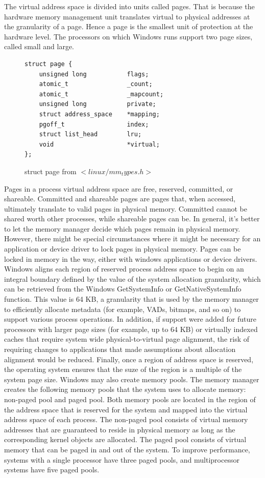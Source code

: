 \documentclass[letterpaper,10pt,draftclsnofoot,onecolumn]{IEEEtran}
\begin{document}
The virtual address space is divided into units called pages. That is because the hardware memory management unit translates virtual to physical addresses at the granularity of a page. Hence a page is the smallest unit of protection at the hardware level. The processors on which Windows runs support two page sizes, called small and large. 
\begin{figure}[H]
\caption{struct page from $<linux/mm_types.h>$}
\begin{lstlisting}
struct page {
	unsigned long 			flags;
	atomic_t				_count;
	atomic_t				_mapcount;
	unsigned long			private;
	struct address_space	*mapping;
	pgoff_t					index;
	struct list_head		lru;
	void					*virtual;
};
\end{lstlisting}
\end{figure}
Pages in a process virtual address space are free, reserved, committed, or shareable. Committed and shareable pages are pages that, when accessed, ultimately translate to valid pages in physical memory. Committed cannot be shared worth other processes, while shareable pages can be. In general, it’s better to let the memory manager decide which pages remain in physical memory. However, there might be special circumstances where it might be necessary for an application or device driver to lock pages in physical memory. Pages can be locked in memory in the way, either with windows applications or device drivers.
Windows aligns each region of reserved process address space to begin on an integral boundary
defined by the value of the system allocation granularity, which can be retrieved from the Windows GetSystemInfo or GetNativeSystemInfo function. This value is 64 KB, a granularity that is used by the memory manager to efficiently allocate metadata (for example, VADs, bitmaps, and so on) to support various process operations. In addition, if support were added for future processors with larger page sizes (for example, up to 64 KB) or virtually indexed caches that require system wide physical-to-virtual page alignment, the risk of requiring changes to applications that made assumptions about allocation alignment would be reduced.\cite{[1]}
Finally, once a region of address space is reserved, the operating system ensures that the suze of the region is a multiple of the system page size.
Windows may also create memory pools. The memory manager creates the following memory pools that the system uses to allocate memory: non-paged pool and paged pool. Both memory pools are located in the region of the address space that is reserved for the system and mapped into the virtual address space of each process. The non-paged pool consists of virtual memory addresses that are guaranteed to reside in physical memory as long as the corresponding kernel objects are allocated. The paged pool consists of virtual memory that can be paged in and out of the system. To improve performance, systems with a single processor have three paged pools, and multiprocessor systems have five paged pools.  
\end{document}
